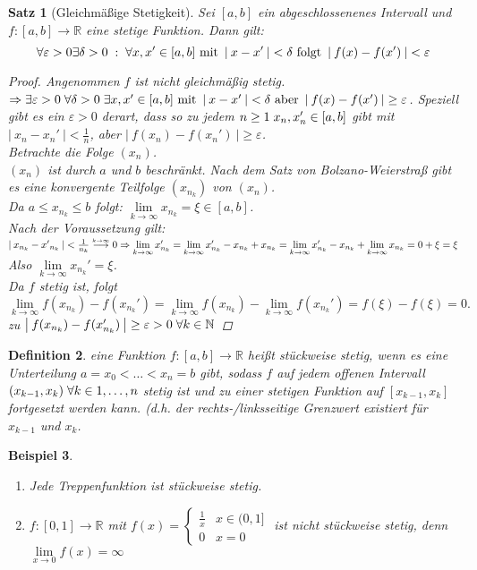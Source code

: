 \documentclass[a4paper,titlepage,oneside]{article}
\def\N{\ensuremath{\mathbb{N}} }
\def\R{\ensuremath{\mathbb{R}} }
\renewcommand{\epsilon}{\ensuremath{\varepsilon} }
\def\WSP{\text{Widerspruch! }}
\def\fa{\ensuremath{\forall}}
\def\sp{\hspace{0,1cm}}
\renewcommand{\liminf}[2][n]{\ensuremath{\lim\limits_{#1 \rightarrow \infty}{#2}}}
\newcommand{\limnull}[2][n]{\ensuremath{\lim\limits_{#1 \rightarrow 0}{#2}}}
\newcommand{\abs}[1]{\ensuremath{\left|\:#1\:\right|}}
\newcommand{\longtoinf}[1][n]{\ensuremath{\overset{\scriptscriptstyle{#1 \to \infty}}{\longrightarrow}}}
\theoremstyle{thmstyle}
\newtheorem{satz}{Satz}[section]
\newtheorem{defi}[satz]{Definition}
\newtheorem{bsp}[satz]{Beispiel}
\theoremstyle{subthmstyle}
\begin{document}
\begin{satz}[Gleichmäßige Stetigkeit]
Sei $[a,b]$ ein abgeschlossenenes Intervall und $ f: [a,b] \to \R $ eine stetige Funktion. Dann gilt:
\[\forall \epsilon > 0 \exists \delta > 0 \sp: \sp \forall x, x' \in [a,b] \text{ mit } \abs{x- x'} < \delta \text{ folgt } \abs{f(x) - f(x')} < \epsilon\]
\begin{proof}
Angenommen $f$ ist nicht gleichmäßig stetig. $\Rightarrow \exists \epsilon > 0 \sp \forall \delta > 0 \sp \exists x,x' \in [a,b] \text{ mit } \abs{x- x'} < \delta \text{ aber } \abs{f(x) - f(x')} \ge \epsilon$. Speziell gibt es ein $\epsilon > 0$ derart, dass so zu jedem $n \ge 1 \sp x_n, x_n' \in [a,b] $ gibt mit $\abs{x_n - x_n'} < \frac{1}{n}$, aber $\abs{f(x_n) - f(x_n')} \ge \epsilon$.\\
Betrachte die Folge $(x_n)$.\\
$(x_n)$ ist durch $a$ und $b$ beschränkt. Nach dem Satz von Bolzano-Weierstraß gibt es eine konvergente Teilfolge $(x_{n_k})$ von $(x_n)$.\\
Da $a \le x_{n_k} \le b$ folgt: $\liminf[k]{x_{n_k}} = \xi \in [a,b]$.\\
Nach der Voraussetzung gilt:
$\abs{x_{n_k} - {x'}_{n_k}} < \frac{1}{n_k} \longtoinf[k] 0\\
\Rightarrow \liminf[k]{x_{n_k}'} = \liminf[k]{x_{n_k}' - x_{n_k} + x_{n_k}} =  \liminf[k]{x_{n_k}' - x_{n_k}} + \liminf[k]{x_{n_k}} = 0 + \xi = \xi$\\
Also  $\liminf[k]{x_{n_k}'} = \xi$.\\
Da $f$ stetig ist, folgt $\liminf[k]{f(x_{n_k}) - f(x_{n_k}')} = \liminf[k]{f(x_{n_k})} - \liminf[k]{f(x_{n_k}')} = f(\xi) - f(\xi) = 0. $\\
\WSP zu $\abs{f(x_{n_k}) - f(x_{n_k}')} \ge \epsilon > 0 \sp \forall k \in \N$
\end{proof}
\end{satz}

\begin{defi}
eine Funktion $f: [a,b] \to \R$ heißt stückweise stetig, wenn es eine Unterteilung $a = x_0 < \dots < x_n = b$ gibt, sodass $f$ auf jedem offenen Intervall $(x_{k-1}, x_k)  \sp \fa k \in {1, \dots, n} $ stetig ist und zu einer stetigen Funktion auf $[x_{k-1}, x_k]$ fortgesetzt werden kann. (d.h. der rechts-/linksseitige Grenzwert existiert für $x_{k-1}$ und $x_k$.
\end{defi}

\begin{bsp}
\begin{enumerate}
\item Jede Treppenfunktion ist stückweise stetig.
\item $f:[0,1] \to \R$ mit $f(x) = \begin{cases} \frac{1}{x} & x \in(0,1]\\ 0 & x = 0\end{cases}$ ist nicht stückweise stetig, denn $\limnull[x]{f(x)} = \infty$
\end{enumerate}
\end{bsp}
\end{document}
